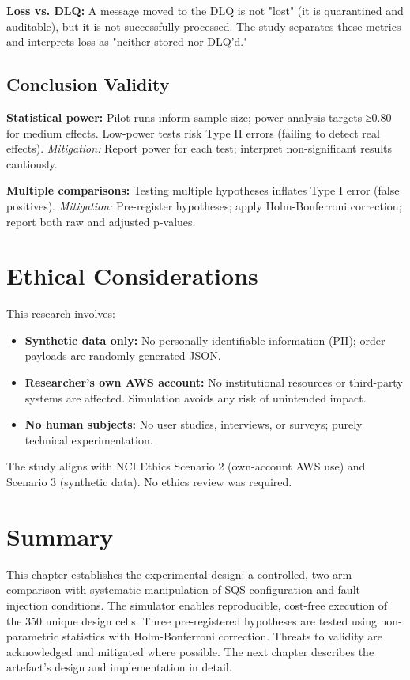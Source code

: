 \textbf{Loss vs. DLQ:} A message moved to the DLQ is not "lost" (it is quarantined and auditable), but it is not successfully processed. The study separates these metrics and interprets loss as "neither stored nor DLQ'd."

\subsection{Conclusion Validity}

\textbf{Statistical power:} Pilot runs inform sample size; power analysis targets ≥0.80 for medium effects. Low-power tests risk Type II errors (failing to detect real effects). \emph{Mitigation:} Report power for each test; interpret non-significant results cautiously.

\textbf{Multiple comparisons:} Testing multiple hypotheses inflates Type I error (false positives). \emph{Mitigation:} Pre-register hypotheses; apply Holm-Bonferroni correction; report both raw and adjusted p-values.

\section{Ethical Considerations}

This research involves:
\begin{itemize}
    \item \textbf{Synthetic data only:} No personally identifiable information (PII); order payloads are randomly generated JSON.
    \item \textbf{Researcher's own AWS account:} No institutional resources or third-party systems are affected. Simulation avoids any risk of unintended impact.
    \item \textbf{No human subjects:} No user studies, interviews, or surveys; purely technical experimentation.
\end{itemize}

The study aligns with NCI Ethics Scenario 2 (own-account AWS use) and Scenario 3 (synthetic data). No ethics review was required.

\section{Summary}

This chapter establishes the experimental design: a controlled, two-arm comparison with systematic manipulation of SQS configuration and fault injection conditions. The simulator enables reproducible, cost-free execution of the 350 unique design cells. Three pre-registered hypotheses are tested using non-parametric statistics with Holm-Bonferroni correction. Threats to validity are acknowledged and mitigated where possible. The next chapter describes the artefact's design and implementation in detail.
